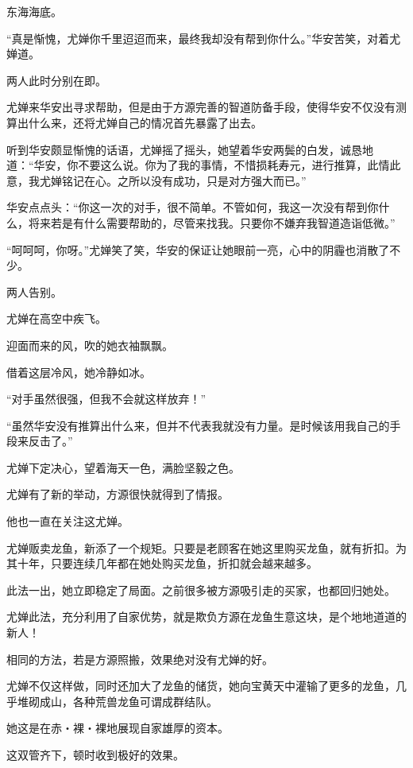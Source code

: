 
\begin{this_body}

东海海底。

“真是惭愧，尤婵你千里迢迢而来，最终我却没有帮到你什么。”华安苦笑，对着尤婵道。

两人此时分别在即。

尤婵来华安出寻求帮助，但是由于方源完善的智道防备手段，使得华安不仅没有测算出什么来，还将尤婵自己的情况首先暴露了出去。

听到华安颇显惭愧的话语，尤婵摇了摇头，她望着华安两鬓的白发，诚恳地道：“华安，你不要这么说。你为了我的事情，不惜损耗寿元，进行推算，此情此意，我尤婵铭记在心。之所以没有成功，只是对方强大而已。”

华安点点头：“你这一次的对手，很不简单。不管如何，我这一次没有帮到你什么，将来若是有什么需要帮助的，尽管来找我。只要你不嫌弃我智道造诣低微。”

“呵呵呵，你呀。”尤婵笑了笑，华安的保证让她眼前一亮，心中的阴霾也消散了不少。

两人告别。

尤婵在高空中疾飞。

迎面而来的风，吹的她衣袖飘飘。

借着这层冷风，她冷静如冰。

“对手虽然很强，但我不会就这样放弃！”

“虽然华安没有推算出什么来，但并不代表我就没有力量。是时候该用我自己的手段来反击了。”

尤婵下定决心，望着海天一色，满脸坚毅之色。

尤婵有了新的举动，方源很快就得到了情报。

他也一直在关注这尤婵。

尤婵贩卖龙鱼，新添了一个规矩。只要是老顾客在她这里购买龙鱼，就有折扣。为其十年，只要连续几年都在她处购买龙鱼，折扣就会越来越多。

此法一出，她立即稳定了局面。之前很多被方源吸引走的买家，也都回归她处。

尤婵此法，充分利用了自家优势，就是欺负方源在龙鱼生意这块，是个地地道道的新人！

相同的方法，若是方源照搬，效果绝对没有尤婵的好。

尤婵不仅这样做，同时还加大了龙鱼的储货，她向宝黄天中灌输了更多的龙鱼，几乎堆砌成山，各种荒兽龙鱼可谓成群结队。

她这是在赤・裸・裸地展现自家雄厚的资本。

这双管齐下，顿时收到极好的效果。


\end{this_body}
